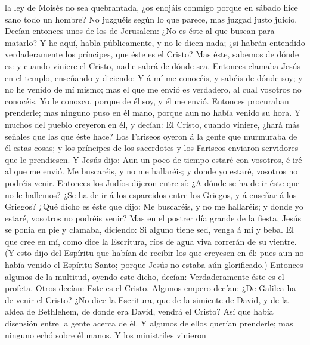 la ley de Moisés no sea quebrantada, ¿os enojáis conmigo porque en
sábado hice sano todo un hombre?  No juzguéis según lo
que parece, mas juzgad justo juicio.  Decían entonces
unos de los de Jerusalem: ¿No es éste al que buscan para matarlo?
 Y he aquí, habla públicamente, y no le dicen nada; ¿si
habrán entendido verdaderamente los príncipes, que éste es el Cristo?
 Mas éste, sabemos de dónde es: y cuando viniere el
Cristo, nadie sabrá de dónde sea.  Entonces clamaba Jesús
en el templo, enseñando y diciendo: Y á mí me conocéis, y sabéis de
dónde soy; y no he venido de mí mismo; mas el que me envió es verdadero,
al cual vosotros no conocéis.  Yo le conozco, porque de
él soy, y él me envió.  Entonces procuraban prenderle;
mas ninguno puso en él mano, porque aun no había venido su hora.
 Y muchos del pueblo creyeron en él, y decían: El Cristo,
cuando viniere, ¿hará más señales que las que éste hace? 
Los Fariseos oyeron á la gente que murmuraba de él estas cosas; y los
príncipes de los sacerdotes y los Fariseos enviaron servidores que le
prendiesen.  Y Jesús dijo: Aun un poco de tiempo estaré
con vosotros, é iré al que me envió.  Me buscaréis, y no
me hallaréis; y donde yo estaré, vosotros no podréis venir.
 Entonces los Judíos dijeron entre sí: ¿A dónde se ha de
ir éste que no le hallemos? ¿Se ha de ir á los esparcidos entre los
Griegos, y á enseñar á los Griegos?  ¿Qué dicho es éste
que dijo: Me buscaréis, y no me hallaréis; y donde yo estaré, vosotros
no podréis venir?  Mas en el postrer día grande de la
fiesta, Jesús se ponía en pie y clamaba, diciendo: Si alguno tiene sed,
venga á mí y beba.  El que cree en mí, como dice la
Escritura, ríos de agua viva correrán de su vientre.  (Y
esto dijo del Espíritu que habían de recibir los que creyesen en él:
pues aun no había venido el Espíritu Santo; porque Jesús no estaba aún
glorificado.)  Entonces algunos de la multitud, oyendo
este dicho, decían: Verdaderamente éste es el profeta. 
Otros decían: Este es el Cristo. Algunos empero decían: ¿De Galilea ha
de venir el Cristo?  ¿No dice la Escritura, que de la
simiente de David, y de la aldea de Bethlehem, de donde era David,
vendrá el Cristo?  Así que había disensión entre la gente
acerca de él.  Y algunos de ellos querían prenderle; mas
ninguno echó sobre él manos.  Y los ministriles vinieron
